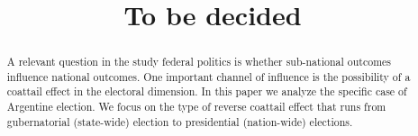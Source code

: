 \documentclass[a4paper,12pt]{article}
\begin{document}
\title{To be decided}

\maketitle


\begin{abstract}
A relevant question in the study federal politics is whether
sub-national outcomes influence national outcomes. One important
channel of influence is the possibility of a coattail effect in the
electoral dimension. In this paper we analyze the specific case of
Argentine election. We  focus on the type of reverse coattail
effect that runs from gubernatorial (state-wide) election
to presidential (nation-wide) elections.
\end{abstract}




\end{document}
